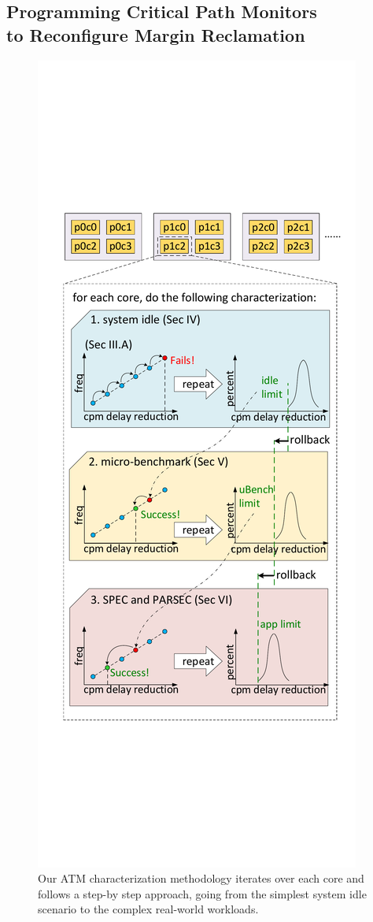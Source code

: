 \subsection{Programming Critical Path Monitors \\to Reconfigure Margin Reclamation}
\label{sec:process:configurability:howto}

\begin{figure}[t!]
  \centering
  \includegraphics[trim=10 280 10 280,clip,width=.8\linewidth]{graphs/process//profile-flow/profile-flow.pdf}
  \caption{Our ATM characterization methodology iterates over each core and follows a step-by step approach, going from the simplest system idle scenario to the complex real-world workloads.}
  \label{fig:methodology}
\end{figure}

